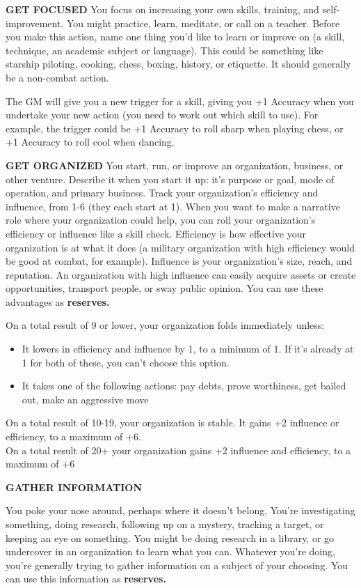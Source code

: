 \textbf{GET FOCUSED}
You focus on increasing your own skills, training, and self-improvement. You might practice, learn, meditate, or call on a teacher. Before you make this action, name one thing you'd like to learn or improve on (a skill, technique, an academic subject or language). This could be something like starship piloting, cooking, chess, boxing, history, or etiquette. It should generally be a non-combat action.

The GM will give you a new trigger for a skill, giving you +1 Accuracy when you undertake your new action (you need to work out which skill to use). For example, the trigger could be +1 Accuracy to roll sharp when playing chess, or +1 Accuracy to roll cool when dancing.

\textbf{GET ORGANIZED}
You start, run, or improve an organization, business, or other venture. Describe it when you start it up: it's purpose or goal, mode of operation, and primary business. Track your organization's efficiency and influence, from 1-6 (they each start at 1). When you want to make a narrative role where your organization could help, you can roll your organization's efficiency or influence like a skill check. Efficiency is how effective your organization is at what it does (a military organization with high efficiency would be good at combat, for example). Influence is your organization's size, reach, and reputation. An organization with high influence can easily acquire assets or create opportunities, transport people, or sway public opinion. You can use these advantages as \textbf{reserves.} 

On a total result of 9 or lower, your organization folds immediately unless:
\begin{itemize}
\item It lowers in efficiency and influence by 1, to a minimum of 1. If it's already at 1 for both of these, you can't choose this option.
\item It takes one of the following actions: pay debts, prove worthiness, get bailed out, make an aggressive move
\end{itemize}  
On a total result of 10-19, your organization is stable. It gains +2 influence or efficiency, to a maximum of +6.\\
On a total result of 20+ your organization gains +2 influence and efficiency, to a maximum of +6

\textbf{GATHER INFORMATION}

You poke your nose around, perhaps where it doesn't belong. You're investigating something, doing research, following up on a mystery, tracking a target, or keeping an eye on something. You might be doing research in a library, or go undercover in an organization to learn what you can. Whatever you're doing, you're generally trying to gather information on a subject of your choosing. You can use this information as \textbf{reserves.} 

